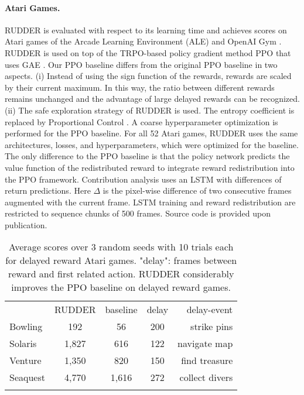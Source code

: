 \documentclass{article}
\begin{document}
\paragraph{Atari Games.}\label{para:Atari}
\label{c:Atari}
RUDDER is evaluated with respect to its learning time and 
achieves scores on Atari games of the
Arcade Learning Environment (ALE) \cite{Bellemare:13}
and OpenAI Gym \cite{Brockman:16}.
RUDDER is used on top of the TRPO-based \cite{Schulman:15icml} 
policy gradient method PPO that uses GAE \cite{Schulman:15}.
Our PPO baseline differs from the original 
PPO baseline \cite{Schulman:17} in two aspects.
(i) Instead of using the sign function of the rewards, 
rewards are scaled by their current maximum.
In this way, the ratio between different rewards
remains unchanged and the advantage of large delayed rewards
can be recognized. 
(ii) The safe exploration strategy of RUDDER is used.
The entropy coefficient is replaced by 
Proportional Control \cite{Bolton:15,Berthelot:17}. 
A coarse hyperparameter optimization is performed for the PPO baseline.
For all 52 Atari games, RUDDER uses 
the same architectures, losses, and hyperparameters, 
which were optimized for the baseline.
The only difference to the PPO baseline is that
the policy network predicts the value function 
of the redistributed reward to integrate reward redistribution
 into the PPO framework.
Contribution analysis uses an LSTM with
differences of return predictions.
Here $\Delta$ is the pixel-wise
difference of two consecutive frames augmented 
with the current frame.
LSTM training and reward redistribution are restricted to
sequence chunks of 500 frames.
Source code is provided upon publication.










\begin{table}
\begin{center}
\begin{tabular}{lcccr}
\toprule
& RUDDER & baseline & delay & delay-event\\
Bowling  & 192 & 56 & 200 & strike pins\\
Solaris  & 1,827 & 616 & 122 & navigate map\\
Venture  & 1,350 & 820 & 150 & find treasure\\
Seaquest  & 4,770 & 1,616 & 272 & collect divers\\
\bottomrule
\\ 
\end{tabular}
\caption{Average scores over 3 random seeds with 10 trials each for 
delayed reward Atari games.
"delay": frames between reward and first related action.  
RUDDER considerably improves the PPO baseline on delayed reward games.\label{tab:atarires}}\end{center}
\end{table}
\end{document}

